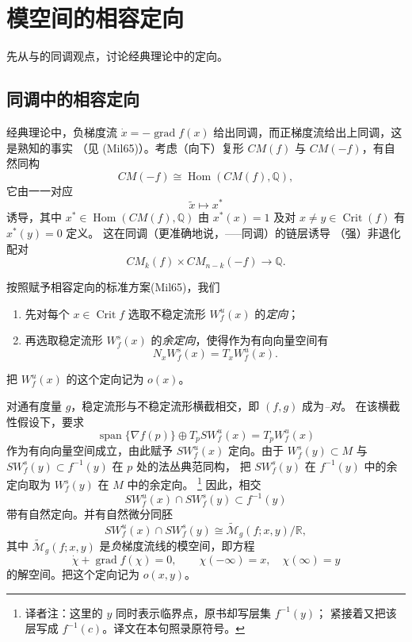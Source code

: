 \section{\personFloer{}模空间的相容定向}
\label{sec:coherent-orientations-floer-moduli}

先从\personWitten{}与\personFloer{}的\personMorse{}同调观点，讨论经典\personMorse{}理论中的定向。

\subsection{\personMorse{}同调中的相容定向}
\label{subsec:coherent-orientations-morse-homology}

经典\personMorse{}理论中，负梯度流
$\dot x=-\operatorname{grad}f(x)$ 给出同调，而正梯度流给出上同调，这是熟知的事实
（见 (Mil65)）。考虑（向下）\personMorse{}复形 $CM(f)$ 与 $CM(-f)$，有自然同构
\[
 CM(-f)\cong\operatorname{Hom}(CM(f),\mathbb Q),
\]
它由一一对应
\begin{equation}
 \widetilde x\longmapsto x^*
 \label{eq:morse-dual-generator-correspondence}
\end{equation}
诱导，其中 $x^*\in\operatorname{Hom}(CM(f),\mathbb Q)$ 由
$x^*(x)=1$ 及对 $x\neq y\in\operatorname{Crit}(f)$ 有 $x^*(y)=0$ 定义。
这在\personMorse{}同调（更准确地说，\personMorse{}--\personSmale{}--\personWitten{}--\personFloer{}同调）的链层诱导
（强）非退化配对
\[
 CM_k(f)\times CM_{n-k}(-f)\longrightarrow\mathbb Q.
\]

按照赋予相容定向的标准方案(Mil65)，我们
\begin{enumerate}[label=(\arabic*)]
\item 先对每个 $x\in\operatorname{Crit}f$ 选取不稳定流形 $W_f^u(x)$ 的\emph{定向}；
\item 再选取稳定流形 $W_f^s(x)$ 的\emph{余定向}，使得作为有向向量空间有
\[
 N_xW_f^s(x)=T_xW_f^u(x).
\]
\end{enumerate}
把 $W_f^u(x)$ 的这个定向记为 $o(x)$。

对通有度量 $g$，稳定流形与不稳定流形横截相交，即 $(f,g)$ 成为\emph{\personMorse{}--\personSmale{}对}。
在该横截性假设下，要求
\[
 \operatorname{span}\{\nabla f(p)\}\oplus T_pS W_f^u(x)
 =T_pW_f^u(x)
\]
作为有向向量空间成立，由此赋予 $S W_f^u(x)$ 定向。由于
$W_f^s(y)\subset M$ 与 $S W_f^s(y)\subset f^{-1}(y)$ 在 $p$ 处的法丛典范同构，
把 $S W_f^s(y)$ 在 $f^{-1}(y)$ 中的余定向取为 $W_f^s(y)$ 在 $M$ 中的余定向。
\footnote{译者注：这里的 $y$ 同时表示临界点，原书却写层集 $f^{-1}(y)$；
紧接着又把该层写成 $f^{-1}(c)$。译文在本句照录原符号。}
因此，相交
\[
 S W_f^u(x)\cap S W_f^s(y)\subset f^{-1}(y)
\]
带有自然定向。并有自然微分同胚
\[
 S W_f^u(x)\cap S W_f^s(y)
 \cong\widetilde{\mathcal M}_g(f;x,y)/\mathbb R,
\]
其中 $\widetilde{\mathcal M}_g(f;x,y)$ 是\emph{负}梯度流线的模空间，即方程
\[
 \dot\chi+\operatorname{grad}f(\chi)=0,
 \qquad \chi(-\infty)=x,
 \quad \chi(\infty)=y
\]
的解空间。把这个定向记为 $o(x,y)$。

